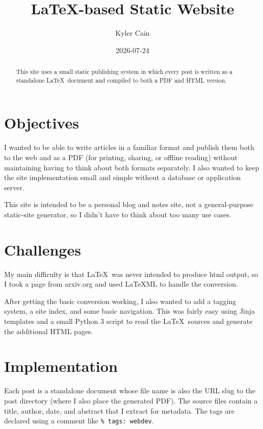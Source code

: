 \documentclass{article}
\title{LaTeX-based Static Website}
\author{Kyler Cain}
\date{2026-07-24}
\begin{document}
\maketitle

\begin{abstract}
This site uses a small static publishing system in which every post is written
as a standalone \LaTeX\ document and compiled to both a PDF and HTML version.
\end{abstract}

\section{Objectives}

I wanted to be able to write articles in a familiar format and publish them both
to the web and as a PDF (for printing, sharing, or offline reading) without
maintaining having to think about both formats separately. I also wanted to keep
the site implementation small and simple without a database or application server.

This site is intended to be a personal blog and notes site, not a general-purpose
static-site generator, so I didn't have to think about too many use cases.

\section{Challenges}

My main difficulty is that \LaTeX\ was never intended to produce html output, so
I took a page from arxiv.org\cite{arxiv_accessible_html} and used
LaTeXML\cite{latexml} to handle the conversion.

After getting the basic conversion working, I also wanted to add a tagging system,
a site index, and some basic navigation. This was fairly easy using
Jinja\cite{jinja} templates and a small Python 3\cite{python3} script to read the
\LaTeX\ sources and generate the additional HTML pages.

\section{Implementation}

Each post is a standalone document whose file name is also the URL slug to the post
directory (where I also place the generated PDF). The source files contain a
title, author, date, and abstract that I extract for metadata. The tags are
declared using a comment like \verb|% tags: webdev|.
\end{document}
